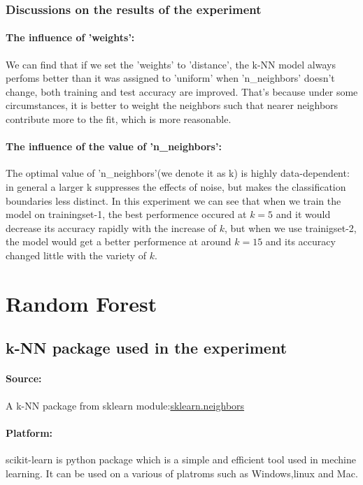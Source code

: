 \documentclass{article}
\begin{document}
	\subsubsection{Discussions on the results of the experiment}
	\paragraph{The influence of 'weights':}We can find that if we set the 'weights' to 'distance', the k-NN model always perfoms better than it was assigned to 'uniform' when 'n\_neighbors' doesn't change, both training and test accuracy are improved. That's because under some circumstances, it is better to weight the neighbors such that nearer neighbors contribute more to the fit, which is more reasonable.
	\paragraph{The influence of the value of 'n\_neighbors':}The optimal value of 'n\_neighbors'(we denote it as k) is highly data-dependent: in general a larger k suppresses the effects of noise, but makes the classification boundaries less distinct. In this experiment we can see that when we train the model on trainingset-1, the best performence occured at $ k=5 $ and it would decrease its accuracy rapidly with the increase of $ k $, but when we use trainigset-2, the model would get a better performence at around $ k=15 $ and its accuracy changed little with the variety of $ k $.
	\section{Random Forest} 
	\subsection{k-NN package used in the experiment}
	\paragraph{Source:}A k-NN package from sklearn module:\href{https://scikit-learn.org/stable/modules/classes.html#module-sklearn.neighbors}{sklearn.neighbors}
	\paragraph{Platform:} scikit-learn is python package which is a simple and efficient tool used in mechine learning. It can be used on a various of platroms such as Windows,linux and Mac.
\end{document}
